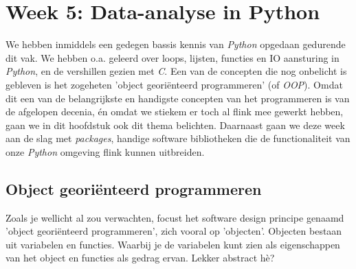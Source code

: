 \chapter{Week 5: Data-analyse in Python}

We hebben inmiddels een gedegen bassis kennis van \textit{Python} opgedaan gedurende dit vak. We hebben o.a. geleerd over loops, lijsten, functies en IO aansturing in \textit{Python}, en de vershillen gezien met \textit{C}. Een van de concepten die nog onbelicht is gebleven is het zogeheten 'object georiënteerd programmeren' (of \textit{OOP}).
Omdat dit een van de belangrijkste en handigste concepten van het programmeren is van de afgelopen decenia, én omdat we stiekem er toch al flink mee gewerkt hebben, gaan we in dit hoofdstuk ook dit thema belichten. Daarnaast gaan we deze week aan de slag met \textit{packages}, handige software bibliotheken die de functionaliteit van onze \textit{Python} omgeving flink kunnen uitbreiden. 

\section{Object georiënteerd programmeren}
Zoals je wellicht al zou verwachten, focust het software design principe genaamd 'object georiënteerd programmeren', zich vooral op 'objecten'. Objecten bestaan uit variabelen en functies. Waarbij je de variabelen kunt zien als eigenschappen van het object en functies als gedrag ervan. Lekker abstract hè? \\

